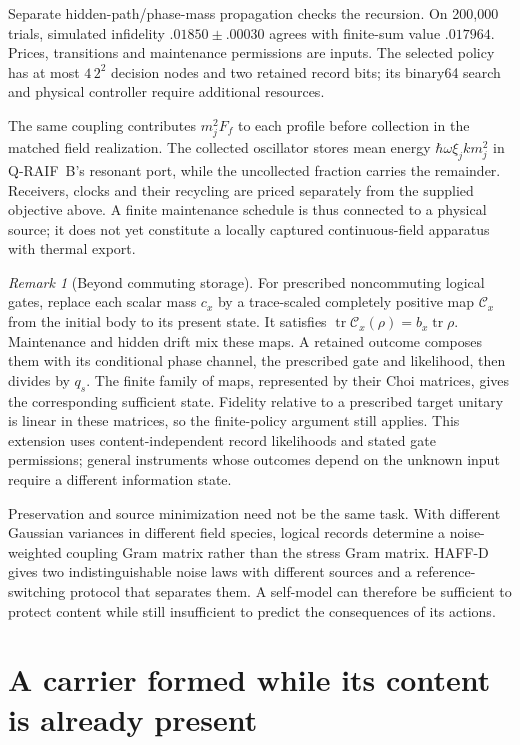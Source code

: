\documentclass[11pt]{article}
\theoremstyle{definition}
\theoremstyle{remark}
\newtheorem{remark}[theorem]{Remark}
\begin{document}
Separate hidden-path/phase-mass propagation checks the recursion. On 200,000 trials, simulated infidelity $.01850\pm.00030$ agrees with finite-sum value $.017964$. Prices, transitions and maintenance permissions are inputs. The selected policy has at most $4\,2^2$ decision nodes and two retained record bits; its binary64 search and physical controller require additional resources.

The same coupling contributes $m_j^2F_f$ to each profile before collection in
the matched field realization. The collected oscillator stores mean energy
$\hbar\omega\xi_jkm_j^2$ in Q-RAIF~B's resonant port, while the uncollected
fraction carries the remainder. Receivers, clocks and their recycling are
priced separately from the supplied objective above. A finite maintenance
schedule is thus connected to a physical source; it does not yet constitute
a locally captured continuous-field apparatus with thermal export.

\begin{remark}[Beyond commuting storage]
For prescribed noncommuting logical gates, replace each scalar mass $c_x$ by
a trace-scaled completely positive map $\mathcal C_x$ from the initial body
to its present state. It satisfies
$\operatorname{tr}\mathcal C_x(\rho)=b_x\operatorname{tr}\rho$.
Maintenance and hidden drift mix these maps. A retained outcome composes
them with its conditional phase channel, the prescribed gate and likelihood,
then divides by $q_s$. The finite family of maps, represented by their Choi
matrices, gives the corresponding sufficient state. Fidelity relative to a
prescribed target unitary is linear in these matrices, so the finite-policy
argument still applies. This extension uses content-independent record
likelihoods and stated gate permissions; general instruments whose outcomes
depend on the unknown input require a different information state.
\end{remark}

Preservation and source minimization need not be the same task. With different
Gaussian variances in different field species, logical records determine a
noise-weighted coupling Gram matrix rather than the stress Gram matrix.
HAFF-D~\cite{HAFFD} gives two indistinguishable noise laws with different
sources and a reference-switching protocol that separates them. A self-model
can therefore be sufficient to protect content while still insufficient to
predict the consequences of its actions.

\section{A carrier formed while its content is already present}
\label{sec:formed-carrier}
\end{document}
